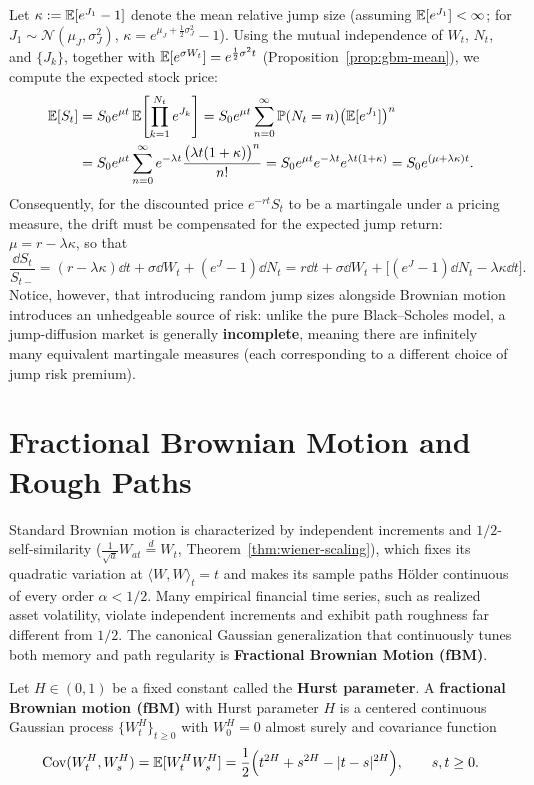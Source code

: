 Let $\kappa := \mathbb{E}[e^{J_1} - 1]$ denote the mean relative jump size (assuming $\mathbb{E}[e^{J_1}] < \infty$; for $J_1 \sim \mathcal{N}(\mu_J, \sigma_J^2)$, $\kappa = e^{\mu_J + \frac{1}{2}\sigma_J^2} - 1$). Using the mutual independence of $W_t$, $N_t$, and $\{J_k\}$, together with $\mathbb{E}[e^{\sigma W_t}] = e^{\frac{1}{2}\sigma^2 t}$ (Proposition~\ref{prop:gbm-mean}), we compute the expected stock price:
\begin{align*}
\mathbb{E}[S_t]
&= S_0 e^{\mu t}\,\mathbb{E}\!\left[\prod_{k=1}^{N_t} e^{J_k}\right]
= S_0 e^{\mu t} \sum_{n=0}^{\infty} \mathbb{P}(N_t = n)\big(\mathbb{E}[e^{J_1}]\big)^n \\
&= S_0 e^{\mu t} \sum_{n=0}^{\infty} e^{-\lambda t}\frac{\big(\lambda t (1 + \kappa)\big)^n}{n!}
= S_0 e^{\mu t} e^{-\lambda t} e^{\lambda t (1 + \kappa)}
= S_0 e^{(\mu + \lambda \kappa)t}.
\end{align*}
Consequently, for the discounted price $e^{-rt} S_t$ to be a martingale under a pricing measure, the drift must be compensated for the expected jump return: $\mu = r - \lambda \kappa$, so that
\[
\frac{\dd S_t}{S_{t-}} = (r - \lambda \kappa)\dd t + \sigma \dd W_t + (e^J - 1)\dd N_t = r \dd t + \sigma \dd W_t + \big[(e^J - 1)\dd N_t - \lambda \kappa \dd t\big].
\]
Notice, however, that introducing random jump sizes alongside Brownian motion introduces an unhedgeable source of risk: unlike the pure Black--Scholes model, a jump-diffusion market is generally \textbf{incomplete}, meaning there are infinitely many equivalent martingale measures (each corresponding to a different choice of jump risk premium).

\section{Fractional Brownian Motion and Rough Paths}
\label{sec:fbm-rough-paths}

Standard Brownian motion is characterized by independent increments and $1/2$-self-similarity ($\frac{1}{\sqrt{a}}W_{at} \stackrel{d}{=} W_t$, Theorem~\ref{thm:wiener-scaling}), which fixes its quadratic variation at $\langle W, W \rangle_t = t$ and makes its sample paths H\"older continuous of every order $\alpha < 1/2$. Many empirical financial time series, such as realized asset volatility, violate independent increments and exhibit path roughness far different from $1/2$. The canonical Gaussian generalization that continuously tunes both memory and path regularity is \textbf{Fractional Brownian Motion (fBM)}.

\begin{definition}
\label{def:fbm}
Let $H \in (0, 1)$ be a fixed constant called the \textbf{Hurst parameter}. A \textbf{fractional Brownian motion (fBM)} with Hurst parameter $H$ is a centered continuous Gaussian process $\{W_t^H\}_{t \ge 0}$ with $W_0^H = 0$ almost surely and covariance function
\begin{equation}
\label{eq:fbm-cov}
\operatorname{Cov}(W_t^H, W_s^H) = \mathbb{E}[W_t^H W_s^H] = \frac{1}{2}\Big(t^{2H} + s^{2H} - |t - s|^{2H}\Big), \qquad s, t \ge 0.
\end{equation}
\end{definition}

